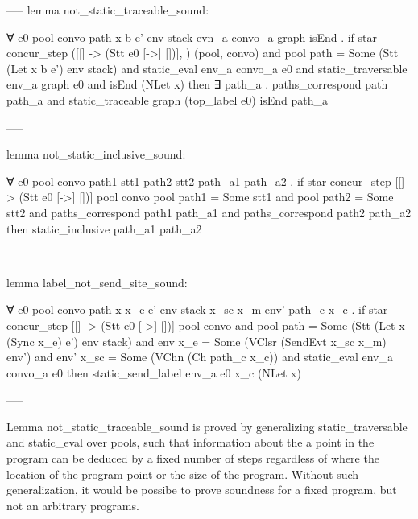 \documentclass{article}
\begin{document}
-----
lemma not_static_traceable_sound:

∀ e0 pool convo path x b e' env stack evn_a convo_a graph isEnd .
  if
    star concur_step ([[] -> (Stt e0 [->] [])], {}) (pool, convo) and 
    pool path = Some (Stt (Let x b e') env stack) and 
    static_eval env_a convo_a e0 and 
    static_traversable env_a graph e0 and 
    isEnd (NLet x)
  then
    ∃ path_a . 
      paths_correspond path path_a and 
      static_traceable graph (top_label e0) isEnd path_a

-----

lemma not_static_inclusive_sound:

∀ e0 pool convo path1 stt1 path2 stt2 path_a1 path_a2 . 
  if
    star concur_step [[] -> (Stt e0 [->] [])] {} pool convo
    pool path1 = Some stt1 and 
    pool path2 = Some stt2 and 
    paths_correspond path1 path_a1 and 
    paths_correspond path2 path_a2
  then
    static_inclusive path_a1 path_a2

-----

lemma label_not_send_site_sound:

∀ e0 pool convo path x x_e e' env stack x_sc x_m env' path_c x_c .
  if
    star concur_step [[] -> (Stt e0 [->] [])] {} pool convo and 
    pool path = Some (Stt (Let x (Sync x_e) e') env stack) and 
    env x_e = Some (VClsr (SendEvt x_sc x_m) env') and 
    env' x_sc = Some (VChn (Ch path_c x_c)) and 
    static_eval env_a convo_a e0
  then 
    static_send_label env_a e0 x_c (NLet x)

-----

Lemma not_static_traceable_sound is proved by generalizing static_traversable and static_eval
over pools, such that information about the a point in the program can be deduced by a fixed
number of steps regardless of where the location of the program point or the size of the
program.  Without such generalization, it would be possibe to prove soundness for a fixed
program, but not an arbitrary programs.
\end{document}

